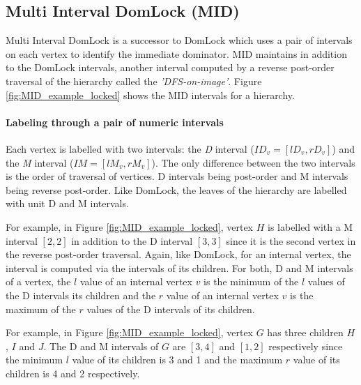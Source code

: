\subsection{Multi Interval DomLock (MID)}
Multi Interval DomLock \cite{anjuMID} is a successor to DomLock which uses a pair of intervals on each vertex to identify the immediate dominator. MID maintains in addition to the DomLock intervals, another interval computed by a reverse post-order traversal of the hierarchy called the \emph{'DFS-on-image'}. Figure \ref{fig:MID_example_locked} shows the MID intervals for a hierarchy. 

\paragraph{Labeling through a pair of numeric intervals}

Each vertex is labelled with two intervals: the \emph{D} interval ($ID_v = [lD_v, rD_v]$) and the \emph{M} interval ($IM = [lM_v, rM_v]$). The only difference between the two intervals is the order of traversal of vertices. D intervals being post-order and M intervals being reverse post-order. Like DomLock, the leaves of the hierarchy are labelled with unit D and M intervals. 

For example, in Figure \ref{fig:MID_example_locked}, vertex $H$ is labelled with a M interval $[2,2]$ in addition to the D interval $[3,3]$ since it is the second vertex in the reverse post-order traversal. Again, like DomLock, for an internal vertex, the interval is computed via the intervals of its children. For both, D and M intervals of a vertex, the $l$ value of an internal vertex $v$ is the minimum of the $l$ values of the D intervals its children and the $r$ value of an internal vertex $v$ is the maximum of the $r$ values of the D intervals of its children.

For example, in Figure \ref{fig:MID_example_locked}, vertex $G$ has three children $H$, $I$ and $J$. The D and M intervals of $G$ are $[3,4]$ and $[1,2]$ respectively since the minimum $l$ value of its children is 3 and 1 and the maximum $r$ value of its children is 4 and 2 respectively.




